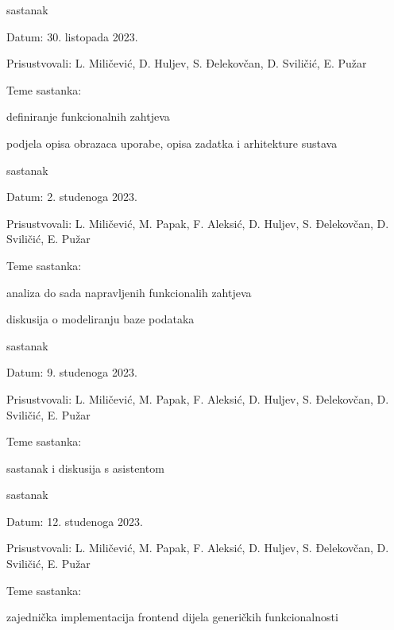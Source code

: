 \begin{packed_enum}
			\item  sastanak
			\item[] \begin{packed_item}
				\item Datum: 30. listopada 2023.
				\item Prisustvovali: L. Miličević, D. Huljev, S. Đelekovčan, D. Sviličić, E. Pužar
				\item Teme sastanka:
				\begin{packed_item}
					\item  definiranje funkcionalnih zahtjeva
					\item  podjela opisa obrazaca uporabe, opisa zadatka i arhitekture sustava
				\end{packed_item}
			\end{packed_item}

			\item  sastanak
			\item[] \begin{packed_item}
				\item Datum: 2. studenoga 2023.
				\item Prisustvovali: L. Miličević, M. Papak, F. Aleksić, D. Huljev, S. Đelekovčan, D. Sviličić, E. Pužar
				\item Teme sastanka:
				\begin{packed_item}
					\item  analiza do sada napravljenih funkcionalih zahtjeva
					\item  diskusija o modeliranju baze podataka
				\end{packed_item}
			\end{packed_item}

			\item  sastanak
			\item[] \begin{packed_item}
				\item Datum: 9. studenoga 2023.
				\item Prisustvovali: L. Miličević, M. Papak, F. Aleksić, D. Huljev, S. Đelekovčan, D. Sviličić, E. Pužar
				\item Teme sastanka:
				\begin{packed_item}
					\item  sastanak i diskusija s asistentom
				\end{packed_item}
			\end{packed_item}

			\item  sastanak
			\item[] \begin{packed_item}
				\item Datum: 12. studenoga 2023.
				\item Prisustvovali: L. Miličević, M. Papak, F. Aleksić, D. Huljev, S. Đelekovčan, D. Sviličić, E. Pužar
				\item Teme sastanka:
				\begin{packed_item}
					\item  zajednička implementacija frontend dijela generičkih funkcionalnosti
				\end{packed_item}
			\end{packed_item}


\end{packed_enum}
